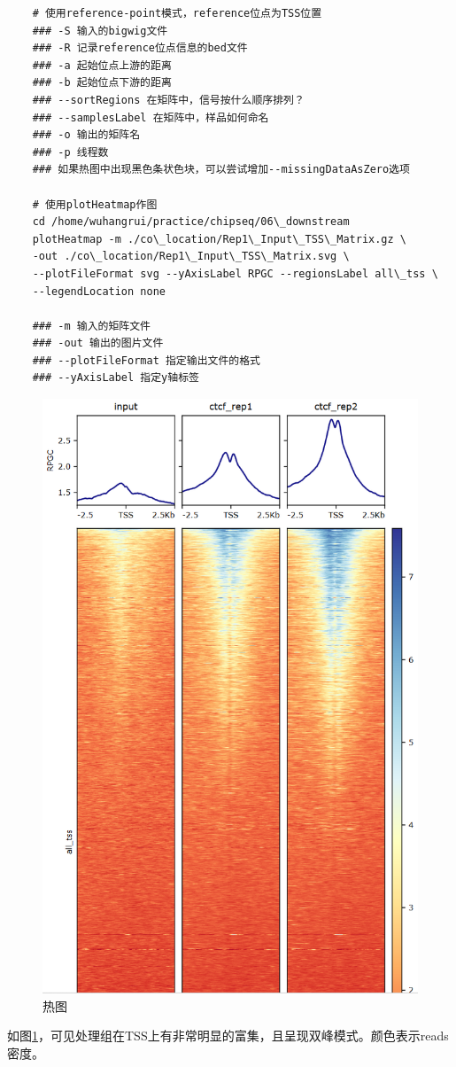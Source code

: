 \begin{lstlisting}
    # 使用reference-point模式，reference位点为TSS位置
    ### -S 输入的bigwig文件
    ### -R 记录reference位点信息的bed文件
    ### -a 起始位点上游的距离
    ### -b 起始位点下游的距离
    ### --sortRegions 在矩阵中，信号按什么顺序排列？
    ### --samplesLabel 在矩阵中，样品如何命名
    ### -o 输出的矩阵名
    ### -p 线程数
    ### 如果热图中出现黑色条状色块，可以尝试增加--missingDataAsZero选项

    # 使用plotHeatmap作图
    cd /home/wuhangrui/practice/chipseq/06\_downstream
    plotHeatmap -m ./co\_location/Rep1\_Input\_TSS\_Matrix.gz \
    -out ./co\_location/Rep1\_Input\_TSS\_Matrix.svg \
    --plotFileFormat svg --yAxisLabel RPGC --regionsLabel all\_tss \
    --legendLocation none

    ### -m 输入的矩阵文件
    ### -out 输出的图片文件
    ### --plotFileFormat 指定输出文件的格式
    ### --yAxisLabel 指定y轴标签
\end{lstlisting}

\begin{figure}[ht]
    \centering
    \includegraphics[width=13cm]{figure/heatmap.png}
    \caption{热图}
    \label{heatmap}
\end{figure}

如图\ref{heatmap}，可见处理组在TSS上有非常明显的富集，且呈现双峰模式。颜色表示reads密度。